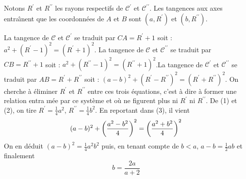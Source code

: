 
Notons $R^{\prime }$ et $R^{\prime \prime }$ les rayons respectifs de $%
\mathcal{C}^{\prime }$ et $\mathcal{C}^{\prime \prime }$. Les
tangences aux
axes entra\^{\i }nent que les coordonn{\'e}es de $A$ et $B$ sont $%
(a,R^{\prime })$ et $(b,R^{\prime \prime })$.


La tangence de $\mathcal{C}$ et $\mathcal{C}^{\prime }$ se traduit par $%
CA=R^{\prime }+1$ soit : $a^{2}+(R^{\prime }-1)^{2}=(R^{\prime }+1)^{2}$.%
\newline
La tangence de $\mathcal{C}$ et $\mathcal{C}^{\prime \prime }$ se
traduit par $CB=R^{\prime \prime }+1$ soit : $a^{2}+(R^{\prime
\prime }-1)^{2}=(R^{\prime \prime }+1)^{2}$.\newline La tangence
de $\mathcal{C}^{\prime }$ et $\mathcal{C}^{\prime \prime }$ se
traduit par $AB=R^{\prime }+R^{\prime \prime }$ soit :
$(a-b)^{2}+(R^{\prime }-R^{\prime \prime })^{2}=(R^{\prime
}+R^{\prime \prime })^{2}.$ \newline On cherche {\`a} {\'e}liminer
$R^{\prime }$ et $R^{\prime \prime }$ entre
ces trois {\'e}quations, c'est {\`a} dire {\`a} former une relation entra\^{%
\i }n{\'e}e par ce syst{\`e}me et o{\`u} ne figurent plus ni $R^{\prime }$ ni
$R^{\prime \prime }$. De (1) et (2), on tire $R^{\prime
}=\frac{1}{4}a^{2} $, $R^{\prime \prime }=\frac{1}{4}b^{2}$. En
reportant dans (3), il vient
\[
(a-b)^{2}+\left( \frac{a^{2}-b^{2}}{4}\right) ^{2}=\left( \frac{a^{2}+b^{2}}{%
4}\right) ^{2}
\]
On en d{\'e}duit $(a-b)^{2}=\frac{1}{4}a^{2}b^{2}$ puis, en tenant
compte de $b<a$, $a-b=\frac{1}{2}ab$ et finalement
\[
b=\frac{2a}{a+2}
\]
